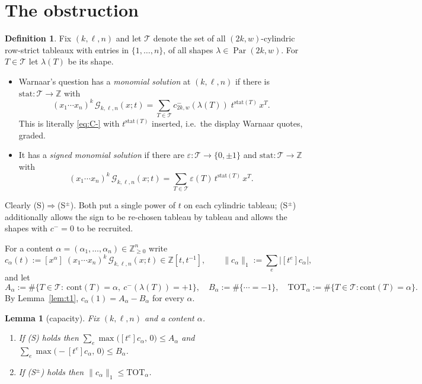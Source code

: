 \documentclass[11pt]{article}
\newtheorem{lemma}[theorem]{Lemma}
\theoremstyle{definition}
\newtheorem{definition}[theorem]{Definition}
\DeclareMathOperator{\Par}{Par}
\newcommand{\la}{\lambda}
\newcommand{\Z}{\mathbb{Z}}
\begin{document}
\section{The obstruction}

\begin{definition}\label{def:stat}
Fix $(k,\ell,n)$ and let $\mathcal T$ denote the set of all $(2k,w)$-cylindric
row-strict tableaux with entries in $\{1,\dots,n\}$, of all shapes
$\la\in\Par(2k,w)$. For $T\in\mathcal T$ let $\la(T)$ be its shape.
\begin{itemize}
\item[(S)] Warnaar's question has a \emph{monomial solution} at $(k,\ell,n)$ if
there is $\mathrm{stat}:\mathcal T\to\Z$ with
\[
 (x_1\cdots x_n)^{k}\,\mathcal G_{k,\ell,n}(x;t)
 =\sum_{T\in\mathcal T}c^{-}_{2k,w}(\la(T))\;t^{\mathrm{stat}(T)}\,x^{T}.
\]
This is literally \eqref{eq:C-} with $t^{\mathrm{stat}(T)}$ inserted, i.e.\ the
display Warnaar quotes, graded.
\item[(S$^\pm$)] It has a \emph{signed monomial solution} if there are
$\varepsilon:\mathcal T\to\{0,\pm1\}$ and $\mathrm{stat}:\mathcal T\to\Z$ with
\[
 (x_1\cdots x_n)^{k}\,\mathcal G_{k,\ell,n}(x;t)
 =\sum_{T\in\mathcal T}\varepsilon(T)\,t^{\mathrm{stat}(T)}\,x^{T}.
\]
\end{itemize}
Clearly (S)$\Rightarrow$(S$^\pm$). Both put a single power of $t$ on each
cylindric tableau; (S$^\pm$) additionally allows the sign to be re-chosen
tableau by tableau and allows the shapes with $c^{-}=0$ to be recruited.
\end{definition}

For a content $\alpha=(\alpha_1,\dots,\alpha_n)\in\Z_{\ge0}^{n}$ write
\[
 c_\alpha(t):=[x^{\alpha}]\;(x_1\cdots x_n)^{k}\,\mathcal G_{k,\ell,n}(x;t)
 \in\Z[t,t^{-1}],\qquad
 \|c_\alpha\|_1:=\sum_{e}\bigl|[t^{e}]c_\alpha\bigr| ,
\]
and let
\[
 A_\alpha:=\#\{T\in\mathcal T:\ \mathrm{cont}(T)=\alpha,\ c^{-}(\la(T))=+1\},\quad
 B_\alpha:=\#\{\cdots=-1\},\quad
 \mathrm{TOT}_\alpha:=\#\{T\in\mathcal T:\mathrm{cont}(T)=\alpha\}.
\]
By Lemma~\ref{lem:t1}, $c_\alpha(1)=A_\alpha-B_\alpha$ for every $\alpha$.

\begin{lemma}[capacity]\label{lem:cap}
Fix $(k,\ell,n)$ and a content $\alpha$.
\begin{enumerate}
\item If \textup{(S)} holds then
 $\displaystyle\sum_{e}\max\bigl([t^{e}]c_\alpha,\,0\bigr)\le A_\alpha$ and
 $\displaystyle\sum_{e}\max\bigl(-[t^{e}]c_\alpha,\,0\bigr)\le B_\alpha$.
\item If \textup{(S$^\pm$)} holds then $\|c_\alpha\|_1\le \mathrm{TOT}_\alpha$.
\end{enumerate}
\end{lemma}
\end{document}

